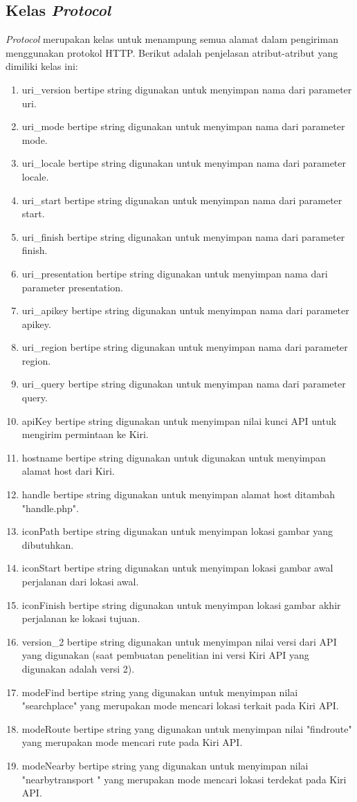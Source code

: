 \subsection{Kelas \textit{Protocol}}
\label{lab:Kelas Protocol}
\hspace{0.5cm} \textit{Protocol} merupakan kelas untuk menampung semua alamat dalam pengiriman menggunakan protokol HTTP. Berikut adalah penjelasan atribut-atribut yang dimiliki kelas ini:
\begin{enumerate}
	\item uri\_version bertipe string digunakan untuk menyimpan nama dari parameter uri.
	\item uri\_mode bertipe string digunakan untuk menyimpan nama dari parameter mode.
	\item uri\_locale bertipe string digunakan untuk menyimpan nama dari parameter locale.
	\item uri\_start bertipe string digunakan untuk menyimpan nama dari parameter start.
	\item uri\_finish bertipe string digunakan untuk menyimpan nama dari parameter finish.
	\item uri\_presentation bertipe string digunakan untuk menyimpan nama dari parameter presentation.
	\item uri\_apikey bertipe string digunakan untuk menyimpan nama dari parameter apikey.
	\item uri\_region bertipe string digunakan untuk menyimpan nama dari parameter region.
	\item uri\_query bertipe string digunakan untuk menyimpan nama dari parameter query.

	\item apiKey bertipe string digunakan untuk menyimpan nilai kunci API untuk mengirim permintaan ke Kiri.
	\item hostname bertipe string digunakan untuk digunakan untuk menyimpan alamat host dari Kiri.
	\item handle bertipe string digunakan untuk menyimpan alamat host ditambah "handle.php".
	\item iconPath bertipe string digunakan untuk menyimpan lokasi gambar yang dibutuhkan.
	\item iconStart bertipe string digunakan untuk menyimpan lokasi gambar awal perjalanan dari lokasi awal.
	\item iconFinish bertipe string digunakan untuk menyimpan lokasi gambar akhir perjalanan ke lokasi tujuan.
	
	\item version\_2 bertipe string digunakan untuk menyimpan nilai versi dari API yang digunakan (saat pembuatan penelitian ini versi Kiri API yang digunakan adalah versi 2).
	\item modeFind bertipe string yang digunakan untuk menyimpan nilai "searchplace" yang merupakan mode mencari lokasi terkait pada Kiri API.
	\item modeRoute bertipe string yang digunakan untuk menyimpan nilai "findroute" yang merupakan mode mencari rute pada Kiri API.
	\item modeNearby bertipe string yang digunakan untuk menyimpan nilai "nearbytransport	" yang merupakan mode mencari lokasi terdekat pada Kiri API.
	

\end{enumerate}
